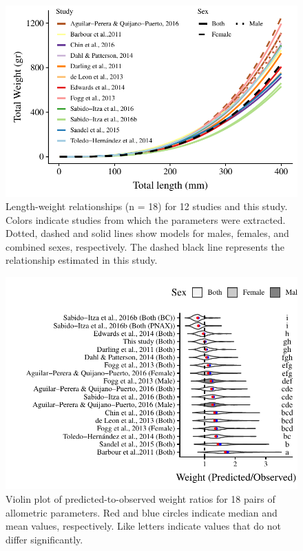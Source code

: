 \documentclass[fleqn,10pt,lineno]{wlpeerj} %
\begin{document}
\begin{figure}
\centering
\includegraphics{Manuscript_files/figure-latex/unnamed-chunk-6-1.pdf}
\caption{\label{fig:all_allo}Length-weight relationships (n = 18) for 12
studies and this study. Colors indicate studies from which the
parameters were extracted. Dotted, dashed and solid lines show models
for males, females, and combined sexes, respectively. The dashed black
line represents the relationship estimated in this study.}
\end{figure}

\begin{figure}
\centering
\includegraphics{Manuscript_files/figure-latex/unnamed-chunk-7-1.pdf}
\caption{\label{fig:bio_ratio}Violin plot of predicted-to-observed
weight ratios for 18 pairs of allometric parameters. Red and blue
circles indicate median and mean values, respectively. Like letters
indicate values that do not differ significantly.}
\end{figure}
\end{document}
